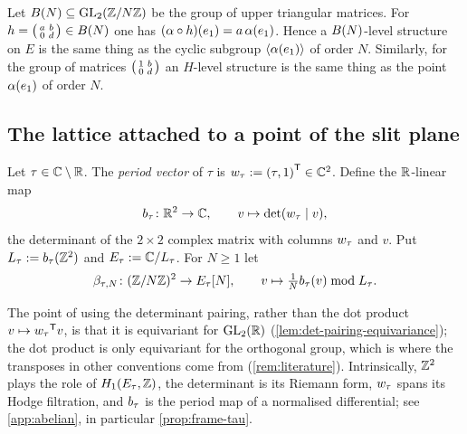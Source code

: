 \begin{example}\label{ex:borel-moduli}
Let $\BorelMod{N} \subseteq \GL{2}{\ResidueRing{N}}$ be the group of upper
triangular matrices. For $h = \left(\begin{smallmatrix} a & b \\ 0 & d \end{smallmatrix}\right) \in B(N)$ one
has $(\alpha \circ h)(e_{1}) = a\,\alpha(e_{1})$.
Hence a $B(N)$-level structure on $E$ is the same thing as the
cyclic subgroup $\langle \alpha(e_{1}) \rangle$ of order
$N$. Similarly, for the group of matrices
$\left(\begin{smallmatrix} 1 & b \\ 0 & d \end{smallmatrix}\right)$ an $H$-level structure is the same thing as the
point $\alpha(e_{1})$ of order $N$.
\end{example}

\subsection{The lattice attached to a point of the slit plane}

\begin{definition}
\label{def:lattice-of-tau}
Let $\tau \in \mathbb{C}\setminus\mathbb{R}$. The \emph{period vector} of $\tau$ is
$w_{\tau} := {(\tau, 1)}^{\mathsf{T}} \in \mathbb{C}^{2}$.
Define the $\mathbb{R}$-linear map
\[
  b_{\tau} \colon \mathbb{R}^{2} \to \mathbb{C}, \qquad
  v \mapsto \det(w_{\tau}\mid v),
\]
the determinant of the $2\times 2$ complex matrix with columns
$w_{\tau}$ and $v$. Put
$L_{\tau} := b_{\tau}(\mathbb{Z}^{2})$ and
$E_{\tau} := \mathbb{C}/L_{\tau}$. For $N \geq 1$ let
\[
  \beta_{\tau,N} \colon (\mathbb{Z}/N\mathbb{Z})^{2} \to
  E_{\tau}[N], \qquad
  v \mapsto \tfrac{1}{N}b_{\tau}(v) \bmod L_{\tau}.
\]
\end{definition}

The point of using the determinant pairing, rather than the dot product
$v \mapsto {w_{\tau}}^{\mathsf{T}} v$, is that it is equivariant
for $\GL{2}{\RR}$ (\cref{lem:det-pairing-equivariance}); the dot product is
only equivariant for the orthogonal group, which is where the transposes
in other conventions come from (\cref{rem:literature}). Intrinsically,
$\mathbb{Z}^{2}$ plays the role of $H_{1}(E_{\tau},\mathbb{Z})$, the
determinant is its Riemann form, $w_{\tau}$ spans its Hodge
filtration, and $b_{\tau}$ is the period map of a normalised
differential; see \cref{app:abelian}, in particular
\cref{prop:frame-tau}.

